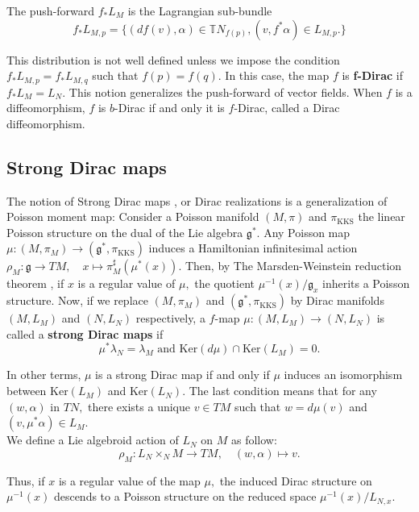 \documentclass[reqno]{amsart}
\theoremstyle{plain}
\theoremstyle{definition}
\newcommand{\g}{\mathfrak{g}}
\newcommand{\too}{\longrightarrow}
\newcommand{\mtoo}{\longmapsto}
\newcommand{\tN}{\mathbb{T}N}
\newcommand{\KKS}{\text{KKS}}
\begin{document}
The push-forward $f_{*}L_{M}$ is the Lagrangian sub-bundle \[
f_{*}L_{M,p} = \{(df(v),\alpha) \in \tN_{f(p)}, (v,f^{*}\alpha) \in L_{M,p}.\}
\]

This distribution is not well defined unless we impose the condition  $f_{*}L_{M,p} = f_{*}L_{M,q}$ such that $f(p) = f(q).$ In this case, the map $f$ is \textbf{f-Dirac} if $f_{*}L_{M} = L_{N}.$ This notion generalizes the push-forward of vector fields. When $f$ is a diffeomorphism, $f$ is $b$-Dirac if and only it is $f$-Dirac, called a Dirac diffeomorphism.\\



\subsection{Strong Dirac maps} The notion of Strong Dirac maps \cite{bualibanu2026reduction}, or Dirac realizations \cite{bursztyn2005dirac} is a generalization of Poisson moment map: Consider a Poisson manifold $(M,\pi)$ and $\pi_{\text{KKS}}$ the linear Poisson structure on the dual of the Lie algebra $\g^{*}.$ Any Poisson map $\mu: (M,\pi_{M})\too (\g^{*},\pi_\KKS)$ induces a Hamiltonian infinitesimal action $\rho_{M}:\g \too TM,\quad x\mtoo \pi_{M}^{\sharp}(\mu^{*}(x)).$ Then, by The Marsden-Weinstein reduction theorem \cite{marsden1974reduction},  if $x$ is a regular value of $\mu,$ the quotient $\mu^{-1}(x)/\g_{x}$ inherits a Poisson structure. Now, if we replace $(M,\pi_M)$ and  $(\g^{*},\pi_{\KKS})$ by Dirac manifolds $(M,L_M)$ and $(N,L_N)$ respectively, a $f$-map $\mu: (M,L_M)\too (N,L_N)$ is called a \textbf{strong Dirac maps} \cite{bualibanu2026reduction} if \[
\mu^{*}\lambda_{N} = \lambda_{M} \text{ and } \text{Ker}(d\mu) \cap \text{Ker}(L_{M}) = 0.
\] 

In other terms, $\mu$ is a strong Dirac map if and only if $\mu$ induces an isomorphism between $\text{Ker}(L_M)$ and $\text{Ker}(L_{N}).$ The last condition means that for any $(w,\alpha)$ in $TN,$ there exists a unique $v \in TM$ such that $w = d\mu(v)$ and $(v,\mu^{*}\alpha)\in L_{M}.$\\


We define a Lie algebroid action of $L_N$ on $M$ as follow: \[
\rho_{M}: L_{N} \times_{N} M \too TM, \quad (w,\alpha)\mtoo v.
\]

Thus, if $x$ is a regular value of the map $\mu,$ the induced Dirac structure on $\mu^{-1}(x)$ descends to a Poisson structure on the reduced space $\mu^{-1}(x)/L_{N,x}.$ 
\end{document}
